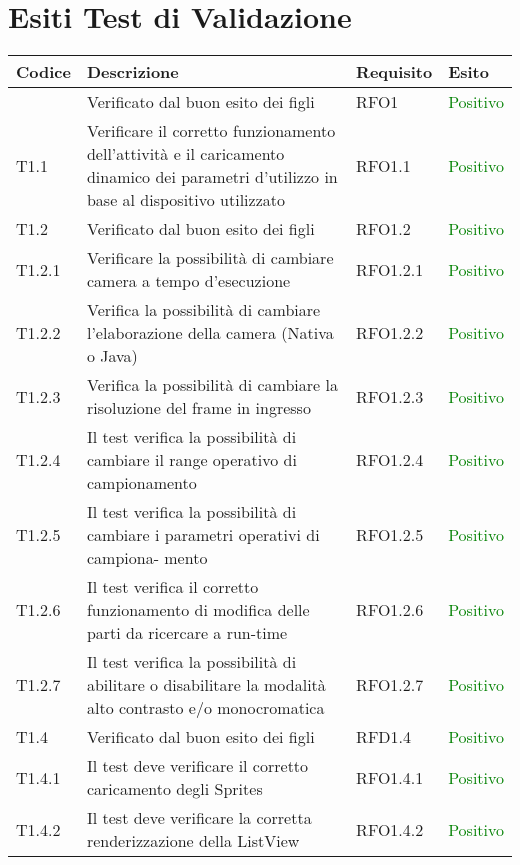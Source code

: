 \section{Esiti Test di Validazione}

\begin{center}
    \begin{longtable}{ | p{2cm} | p{6cm} | p{2cm} | p{2cm} |}
    \hline
    Codice & Descrizione & Requisito & Esito \\ \hline
        & Verificato dal buon esito dei figli &RFO1 & \textcolor{green}{Positivo}\\ \hline 
    T1.1& Verificare il corretto funzionamento dell'attività e il caricamento dinamico dei parametri d'utilizzo in base al dispositivo utilizzato &RFO1.1 & \textcolor{green}{Positivo}\\ \hline 
    T1.2& Verificato dal buon esito dei figli  &RFO1.2 & \textcolor{green}{Positivo}\\ \hline 
    T1.2.1& Verificare la possibilità di cambiare camera a tempo d'esecuzione &RFO1.2.1 & \textcolor{green}{Positivo}\\ \hline 
    T1.2.2& Verifica la possibilità di cambiare l'elaborazione della camera (Nativa o Java) &RFO1.2.2 & \textcolor{green}{Positivo}\\ \hline 
   T1.2.3 &Verifica la possibilità di cambiare la risoluzione del frame in ingresso&RFO1.2.3 & \textcolor{green}{Positivo}\\ \hline 
    T1.2.4& Il test verifica la possibilità di cambiare il range operativo di campionamento &RFO1.2.4 & \textcolor{green}{Positivo}\\ \hline 
    T1.2.5&Il test verifica la possibilità di cambiare i parametri operativi di campiona-
mento &RFO1.2.5 & \textcolor{green}{Positivo}\\ \hline 
    T1.2.6&Il test verifica il corretto funzionamento di modifica delle parti da ricercare a
run-time &RFO1.2.6 & \textcolor{green}{Positivo}\\ \hline 
    T1.2.7&Il test verifica la possibilità di abilitare o disabilitare la modalità alto contrasto
e/o monocromatica &RFO1.2.7 & \textcolor{green}{Positivo}\\ \hline 
    T1.4& Verificato dal buon esito dei figli &RFD1.4 & \textcolor{green}{Positivo}\\ \hline 
    T1.4.1&Il test deve verificare il corretto caricamento degli Sprites &RFO1.4.1 & \textcolor{green}{Positivo}\\ \hline 
    T1.4.2&Il test deve verificare la corretta renderizzazione della ListView &RFO1.4.2 & \textcolor{green}{Positivo}\\ \hline 

\end{longtable}
\end{center}
